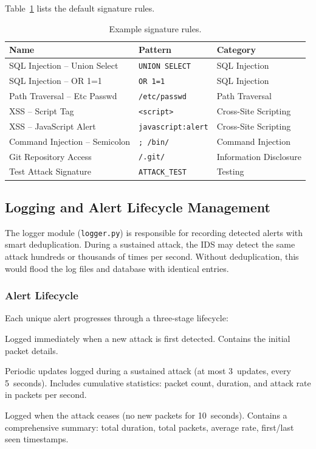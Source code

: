 \documentclass[12pt,a4paper]{article}
\begin{document}
Table~\ref{tab:signatures} lists the default signature rules.

\begin{table}[H]
\centering
\caption{Example signature rules.}
\label{tab:signatures}
\begin{tabular}{llp{4cm}}
\toprule
\textbf{Name} & \textbf{Pattern} & \textbf{Category} \\
\midrule
SQL Injection -- Union Select  & \texttt{UNION SELECT}    & SQL Injection \\
SQL Injection -- OR 1=1        & \texttt{OR 1=1}          & SQL Injection \\
Path Traversal -- Etc Passwd   & \texttt{/etc/passwd}     & Path Traversal \\
XSS -- Script Tag              & \texttt{<script>}        & Cross-Site Scripting \\
XSS -- JavaScript Alert        & \texttt{javascript:alert}& Cross-Site Scripting \\
Command Injection -- Semicolon & \texttt{; /bin/}         & Command Injection \\
Git Repository Access          & \texttt{/.git/}          & Information Disclosure \\
Test Attack Signature          & \texttt{ATTACK\_TEST}    & Testing \\
\bottomrule
\end{tabular}
\end{table}

\subsection{Logging and Alert Lifecycle Management}
\label{sec:logging}

The logger module (\texttt{logger.py}) is responsible for recording detected alerts with smart deduplication. During a sustained attack, the IDS may detect the same attack hundreds or thousands of times per second. Without deduplication, this would flood the log files and database with identical entries.

\subsubsection{Alert Lifecycle}

Each unique alert progresses through a three-stage lifecycle:

\begin{description}[style=nextline]
    \item[STARTED] Logged immediately when a new attack is first detected. Contains the initial packet details.
    \item[ONGOING] Periodic updates logged during a sustained attack (at most 3~updates, every 5~seconds). Includes cumulative statistics: packet count, duration, and attack rate in packets per second.
    \item[ENDED] Logged when the attack ceases (no new packets for 10~seconds). Contains a comprehensive summary: total duration, total packets, average rate, first/last seen timestamps.
\end{description}
\end{document}
